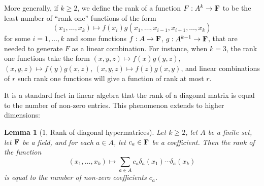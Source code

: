 \documentclass[UTF8,11pt]{ctexart}
\newtheorem*{lemma}{Lemma}
\theoremstyle{definition}
\begin{document}
More generally, if $k\ge2$, we define the rank of a function $F:A^k\to{\bf F}$ to be the least number of ``rank one'' functions of the form
\[
(x_1,\ldots,x_k)\mapsto f(x_i)g(x_1,\ldots,x_{i-1},x_{i+1},\ldots,x_k)
\]
for some $i=1,\ldots,k$ and some functions $f:A\to{\bf F}$, $g:A^{k-1}\to{\bf F}$, that are needed to generate $F$ as a linear combination. For instance, when $k=3$, the rank one functions take the form $(x,y,z)\mapsto f(x)g(y,z)$, $(x,y,z)\mapsto f(y)g(x,z)$, $(x,y,z)\mapsto f(z)g(x,y)$, and linear combinations of $r$ such rank one functions will give a function of rank at most $r$.

It is a standard fact in linear algebra that the rank of a diagonal matrix is equal to the number of non-zero entries. This phenomenon extends to higher dimensions:
\begin{lemma}[1, Rank of diagonal hypermatrices]
Let $k\ge2$, let $A$ be a finite set, let ${\bf F}$ be a field, and for each $a\in A$, let $c_a\in{\bf F}$ be a coefficient. Then the rank of the function
\begin{equation}
(x_1,\ldots,x_k)\mapsto\sum_{a\in A}c_a\delta_a(x_1)\cdots\delta_a(x_k)\tag{2}
\end{equation}
is equal to the number of non-zero coefficients $c_a$.
\end{lemma}
\end{document}
